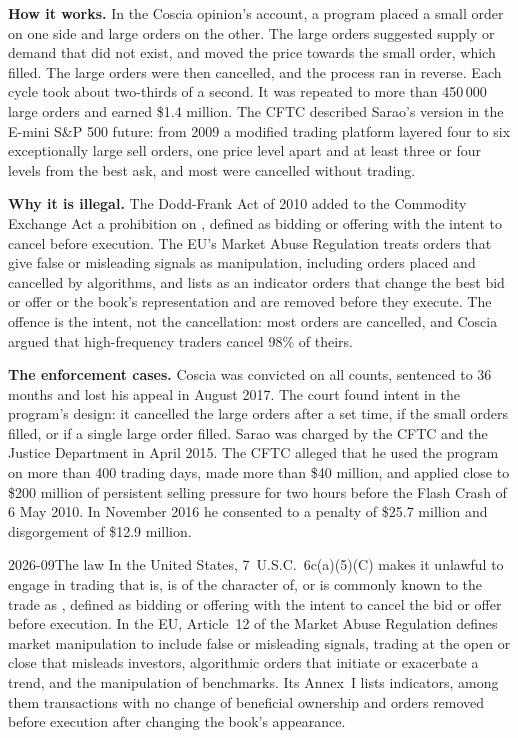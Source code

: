 \textbf{How it works.} In the Coscia opinion's account, a program placed a small order on one side and large orders on the other. The large orders
suggested supply or demand that did not exist, and moved the price towards the small order, which filled. The large orders were then cancelled,
and the process ran in reverse. Each cycle took about two-thirds of a second. It was repeated to more than 450\,000 large orders and earned \$1.4
million. The CFTC described Sarao's version in the E-mini S\&P 500 future: from 2009 a modified trading platform layered four to six exceptionally
large sell orders, one price level apart and at least three or four levels from the best ask, and most were cancelled without trading.

\textbf{Why it is illegal.} The Dodd-Frank Act of 2010 added to the Commodity Exchange Act a prohibition on , defined as bidding or offering with the
intent to cancel before execution. The EU's Market Abuse Regulation treats orders that give false or misleading signals as manipulation, including
orders placed and cancelled by algorithms, and lists as an indicator orders that change the best bid or offer or the book's representation and are
removed before they execute. The offence is the intent, not the cancellation: most orders are cancelled, and Coscia argued that high-frequency traders
cancel 98\% of theirs.

\textbf{The enforcement cases.} Coscia was convicted on all counts, sentenced to 36 months and lost his appeal in August 2017. The court found intent in
the program's design: it cancelled the large orders after a set time, if the small orders filled, or if a single large order filled. Sarao was charged
by the CFTC and the Justice Department in April 2015. The CFTC alleged that he used the  program on more than 400 trading days, made more than
\$40 million, and applied close to \$200 million of persistent selling pressure for two hours before the Flash Crash of 6 May 2010. In November 2016 he
consented to a penalty of \$25.7 million and disgorgement of \$12.9 million.

\begin{dated}{2026-09}{The law}\label{dat:s2:manipulative-strategies-and-how-they-are-caught:law}
In the United States, 7~U.S.C.~6c(a)(5)(C) makes it unlawful to engage in trading that is, is of the character of, or is commonly known to the trade as
, defined as bidding or offering with the intent to cancel the bid or offer before execution. In the EU, Article~12 of the Market Abuse Regulation
defines market manipulation to include false or misleading signals, trading at the open or close that misleads investors, algorithmic orders that
initiate or exacerbate a trend, and the manipulation of benchmarks. Its Annex~I lists indicators, among them transactions with no change of
beneficial ownership and orders removed before execution after changing the book's appearance.
\end{dated}

